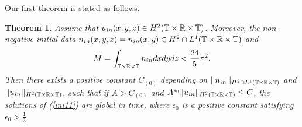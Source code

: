\documentclass[12pt, reqno]{amsart}
\newtheorem{theorem}{Theorem}[section]
\numberwithin{equation}{section}
\begin{document}
Our first theorem  is stated as follows.
\begin{theorem}\label{result0}
	Assume that $ u_{\rm in}(x,y,z)\in H^2
	(\mathbb{T}\times\mathbb{R}\times\mathbb{T})$.
	Moreover, the non-negative initial data $ n_{\rm in}(x,y,z)=n_{\rm in}(x,y)\in H^2\cap L^1(\mathbb{T}\times\mathbb{R}\times\mathbb{T})$  and $$M=   \int_{\mathbb{T}\times\mathbb{R}\times\mathbb{T}}n_{\rm in}dxdydz < \frac{24}{5}\pi^2.$$
	Then there exists a positive constant $C_{(0)}$ depending on $||n_{\rm in}||_{H^2\cap L^1(\mathbb{T}\times\mathbb{R}\times\mathbb{T})}$ 
	and $||u_{\rm in}||_{H^2(\mathbb{T}\times\mathbb{R}\times\mathbb{T})}$, such that if $A>C_{(0)}$ and $A^{\epsilon_0}\|u_{\rm in}\|_{H^2(\mathbb{T}\times\mathbb{R}\times\mathbb{T})}\leq C$, the solutions of {\rm (\ref{ini11})} are global in time,
	where $\epsilon_0$ is a positive constant satisfying $\epsilon_0>\frac{1}{3}$.
	
\end{theorem}
\end{document}
